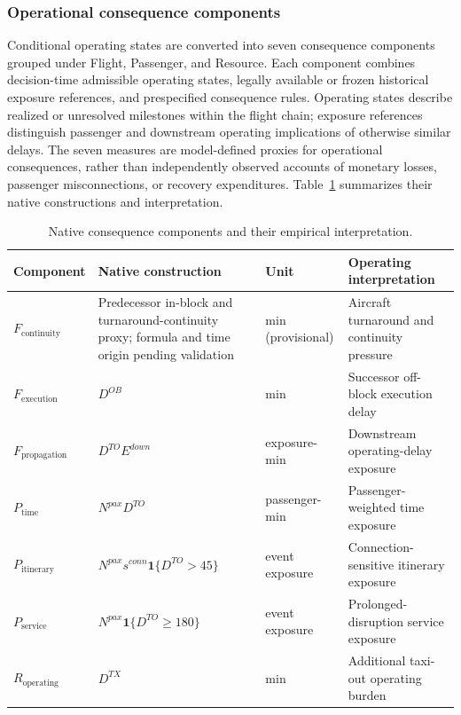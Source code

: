 \subsubsection{Operational consequence components}

Conditional operating states are converted into seven consequence components grouped under Flight, Passenger, and Resource. Each component combines decision-time admissible operating states, legally available or frozen historical exposure references, and prespecified consequence rules. Operating states describe realized or unresolved milestones within the flight chain; exposure references distinguish passenger and downstream operating implications of otherwise similar delays. The seven measures are model-defined proxies for operational consequences, rather than independently observed accounts of monetary losses, passenger misconnections, or recovery expenditures. Table~\ref{tab:consequence_native_sec4} summarizes their native constructions and interpretation.

\begin{table}[t]
\centering
\scriptsize
\caption{Native consequence components and their empirical interpretation.}
\label{tab:consequence_native_sec4}
\renewcommand{\arraystretch}{1.12}
\begin{tabular}{p{3.0cm} p{4.2cm} p{2.0cm} p{5.1cm}}
\hline
Component & Native construction & Unit & Operating interpretation \\
\hline
$F_{\mathrm{continuity}}$ & Predecessor in-block and turnaround-continuity proxy; formula and time origin pending validation & min (provisional) & Aircraft turnaround and continuity pressure \\
$F_{\mathrm{execution}}$ & $D^{OB}$ & min & Successor off-block execution delay \\
$F_{\mathrm{propagation}}$ & $D^{TO}E^{down}$ & exposure-min & Downstream operating-delay exposure \\
$P_{\mathrm{time}}$ & $N^{pax}D^{TO}$ & passenger-min & Passenger-weighted time exposure \\
$P_{\mathrm{itinerary}}$ & $N^{pax}s^{conn}\mathbf1\{D^{TO}>45\}$ & event exposure & Connection-sensitive itinerary exposure \\
$P_{\mathrm{service}}$ & $N^{pax}\mathbf1\{D^{TO}\geq180\}$ & event exposure & Prolonged-disruption service exposure \\
$R_{\mathrm{operating}}$ & $D^{TX}$ & min & Additional taxi-out operating burden \\
\hline
\end{tabular}
\end{table}

